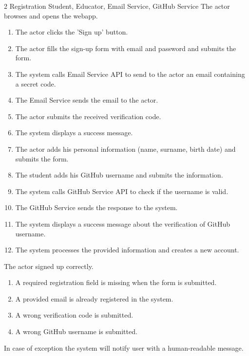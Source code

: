 \usecase
{2}
{Registration} %
{Student, Educator, Email Service, GitHub Service} %
{The actor browses and opens the webapp.} %
{ %
    \begin{enumerate}
        \item The actor clicks the 'Sign up' button.
        \item The actor fills the sign-up form with email and password and submits the form.
        \item The system calls Email Service API to send to the actor an email containing a secret code.
        \item The Email Service sends the email to the actor.
        \item The actor submits the received verification code.
        \item The system displays a success message.
        \item The actor adds his personal information (name, surname, birth date) and submits the form.
        \item The student adds his GitHub username and submits the information.
        \item The system calls GitHub Service API to check if the username is valid.
        \item The GitHub Service sends the response to the system.
        \item The system displays a success message about the verification of GitHub username.
        \item The system processes the provided information and creates a new account.
    \end{enumerate}
}
{The actor signed up correctly.} %
{ %
    \begin{enumerate}
        \item A required registration field is missing when the form is submitted.
        \item A provided email is already registered in the system.
        \item A wrong verification code is submitted.
        \item A wrong GitHub username is submitted.
    \end{enumerate}
}
{ %
In case of exception the system will notify user with a human-readable message.
}

